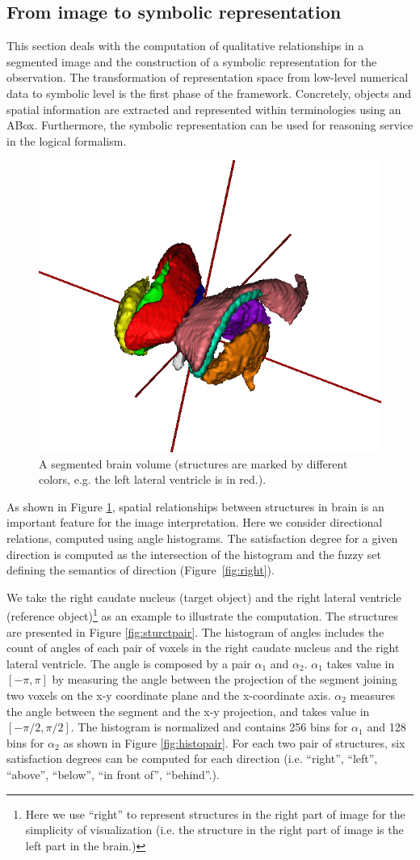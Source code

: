 \documentclass{article}
\begin{document}
\subsection{From image to symbolic representation}
 This section deals with the computation of qualitative relationships in a segmented image and the construction of a symbolic representation for the observation. 
The transformation of representation space from low-level numerical data to symbolic level is the first phase of the framework.
Concretely, objects and spatial information are extracted and represented within terminologies using an ABox.
Furthermore, the symbolic representation can be used for  reasoning service in the logical formalism.

\begin{figure}[h]
 \centering
 \includegraphics[width=.3\textwidth]{./figures/mesh_all_vue_45.png}
 \caption{\label{fig:brain3d}A segmented brain volume (structures are marked by different colors, e.g. the left lateral ventricle is in red.).}
\end{figure}
As  shown in Figure \ref{fig:brain3d}, spatial relationships between structures in brain is an important feature for the image interpretation. 
Here we consider directional relations, computed using angle histograms.
The satisfaction degree for a given direction is computed as the intersection of the histogram and the fuzzy set defining the semantics of direction (Figure~\ref{fig:right}).

We take the right caudate nucleus (target object) and the right lateral ventricle (reference object)\footnote{Here we use ``right'' to represent 
structures in the right part of image for the simplicity of visualization (i.e. the structure in the right part of image is the left part in the brain.)} as an example to illustrate the computation.
The structures are presented in Figure \ref{fig:sturctpair}.
The histogram of angles includes the count of angles of each pair of voxels in the right caudate nucleus and the right lateral ventricle.
The angle is composed by a pair $\alpha_1$ and $\alpha_2$. 
$\alpha_1$ takes value in $[-\pi, \pi]$ by measuring the angle between the projection of the segment joining two voxels on the x-y coordinate plane and the x-coordinate axis.
$\alpha_2$ measures the angle between the segment and the x-y projection, and takes value in $[-\pi/2, \pi/2]$.
The histogram is normalized and contains 256 bins for $\alpha_1$ and 128 bins for $\alpha_2$ as shown in Figure \ref{fig:histopair}.
For each two pair of structures, six satisfaction degrees can be computed for each direction (i.e. ``right'', ``left'', ``above'', ``below'', ``in front of'', ``behind''.).
\end{document}
